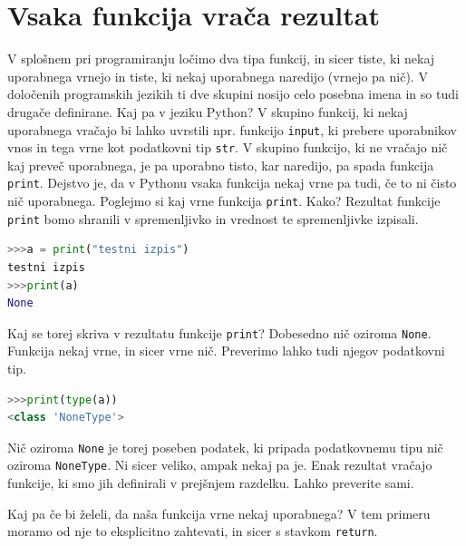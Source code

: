 \section{Vsaka funkcija vrača rezultat}
V splošnem pri programiranju ločimo dva tipa funkcij, in sicer tiste, ki nekaj uporabnega vrnejo in tiste, ki nekaj uporabnega naredijo (vrnejo pa nič). V določenih programskih jezikih ti dve skupini nosijo celo posebna imena in so tudi drugače definirane. Kaj pa v jeziku Python? V skupino funkcij, ki nekaj uporabnega vračajo bi lahko uvrstili npr. funkcijo \texttt{input}, ki prebere uporabnikov vnos in tega vrne kot podatkovni tip \texttt{str}. V skupino funkcijo, ki ne vračajo nič kaj preveč uporabnega, je pa uporabno tisto, kar naredijo, pa spada funkcija \texttt{print}. Dejstvo je, da v Pythonu vsaka funkcija nekaj vrne pa tudi, če to ni čisto nič uporabnega. Poglejmo si kaj vrne funkcija \texttt{print}. Kako? Rezultat funkcije \texttt{print} bomo shranili v spremenljivko in vrednost te spremenljivke izpisali.
\begin{lstlisting}[language=Python, showstringspaces=false]
>>>a = print("testni izpis")
testni izpis
>>>print(a)
None
\end{lstlisting}
Kaj se torej skriva v rezultatu funkcije \texttt{print}? Dobesedno nič oziroma \texttt{None}. Funkcija nekaj vrne, in sicer vrne nič. Preverimo lahko tudi njegov podatkovni tip.
\begin{lstlisting}[language=Python, showstringspaces=false]
>>>print(type(a))
<class 'NoneType'>
\end{lstlisting}
Nič oziroma \texttt{None} je torej poseben podatek, ki pripada podatkovnemu tipu nič oziroma \texttt{NoneType}. Ni sicer veliko, ampak nekaj pa je. Enak rezultat vračajo funkcije, ki smo jih definirali v prejšnjem razdelku. Lahko preverite sami.

Kaj pa če bi želeli, da naša funkcija vrne nekaj uporabnega? V tem primeru moramo od nje to eksplicitno zahtevati, in sicer s stavkom \texttt{return}.

